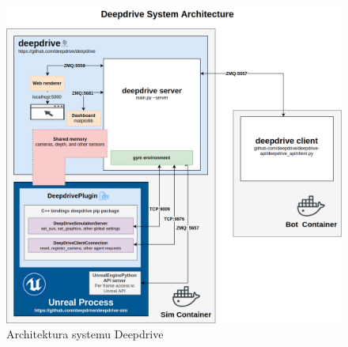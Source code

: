 \vspace{0.3cm}
\begin{figure}[H]
\centering
\includegraphics[width=16cm]{resources/figures/deepdrive-architecture.png}
\caption{Architektura systemu Deepdrive}
\label{DeepdriveArchitecture}
\end{figure}

